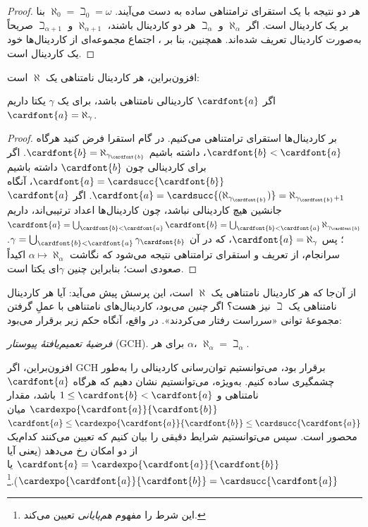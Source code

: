 \documentclass[../../../include/open-logic-section]{subfiles}
\begin{document}
\begin{proof}
هر دو نتیجه با یک استقرای ترامتناهی ساده به دست می‌آیند.
$\aleph_0 = \beth_0 = \omega$ بنا بر
 یک کاردینال است. اگر
$\aleph_\alpha$ و $\beth_\alpha$ هر دو کاردینال باشند،
$\aleph_{\alpha+1}$ و $\beth_{\alpha+1}$ صریحاً به‌صورت کاردینال تعریف
شده‌اند. همچنین، بنا بر
، اجتماع مجموعه‌ای از
کاردینال‌ها خود یک کاردینال است.
\end{proof}
\noindent
افزون‌براین، هر کاردینال نامتناهی یک $\aleph$ است:

\begin{prop}
اگر $\cardfont{a}$ کاردینالی نامتناهی باشد، برای یک $\gamma$ یکتا داریم
$\cardfont{a} = \aleph_\gamma$.
\end{prop}

\begin{proof}
بر کاردینال‌ها استقرای ترامتناهی می‌کنیم. در گام استقرا فرض کنید هرگاه
$\cardfont{b} < \cardfont{a}$، داشته باشیم
$\cardfont{b} = \aleph_{\gamma_\cardfont{b}}$. اگر برای کاردینالی چون
$\cardfont{b}$ داشته باشیم $\cardfont{a} = \cardsucc{\cardfont{b}}$،
آنگاه $\cardfont{a} =
\cardsucc{(\aleph_{\gamma_\cardfont{b}})}=
\aleph_{\gamma_\cardfont{b}+1}$. اگر $\cardfont{a}$ جانشین هیچ
کاردینالی نباشد، چون کاردینال‌ها اعداد ترتیبی‌اند، داریم
$\cardfont{a} = \bigcup_{\cardfont{b} < \cardfont{a}} \cardfont{b} =
\bigcup_{\cardfont{b} < \cardfont{a}}{\aleph_{\gamma_\cardfont{b}}}$؛
پس $\cardfont{a} = \aleph_\gamma$، که در آن
$\gamma = \bigcup_{\cardfont{b} < \cardfont{a}}
\gamma_\cardfont{b}$. سرانجام، از تعریف و استقرای ترامتناهی نتیجه می‌شود
که نگاشت $\alpha\mapsto\aleph_\alpha$ اکیداً صعودی است؛ بنابراین چنین
$\gamma$ای یکتا است.
\end{proof}

از آن‌جا که هر کاردینال نامتناهی یک $\aleph$ است، این پرسش پیش می‌آید:
آیا هر کاردینال نامتناهی یک $\beth$ نیز هست؟ اگر \emph{چنین} می‌بود،
کاردینال‌های نامتناهی با عملِ گرفتن مجموعهٔ توانی «سرراست رفتار
می‌کردند». در واقع، آنگاه حکم زیر برقرار می‌بود:

\begin{defish}
\emph{فرضیهٔ تعمیم‌یافتهٔ پیوستار} (GCH). برای هر $\alpha$،
$\aleph_\alpha = \beth_\alpha$.
\end{defish}

افزون‌براین، اگر GCH برقرار بود، می‌توانستیم توان‌رسانی کاردینالی را
به‌طور چشمگیری ساده کنیم. به‌ویژه، می‌توانستیم نشان دهیم که هرگاه
$\cardfont{a}$ نامتناهی و $1 \leq \cardfont{b} < \cardfont{a}$ باشد،
مقدار $\cardexpo{\cardfont{a}}{\cardfont{b}}$ میان
$\cardfont{a}\leq \cardexpo{\cardfont{a}}{\cardfont{b}} \leq
\cardsucc{\cardfont{a}}$ محصور است. سپس می‌توانستیم شرایط دقیقی را بیان
کنیم که تعیین می‌کنند کدام‌یک از دو امکان رخ می‌دهد (یعنی آیا
$\cardfont{a} = \cardexpo{\cardfont{a}}{\cardfont{b}}$ یا
$\cardexpo{\cardfont{a}}{\cardfont{b}} =
\cardsucc{\cardfont{a}}$).\footnote{این شرط را مفهوم
\emph{هم‌پایانی} تعیین می‌کند.}
\end{document}

